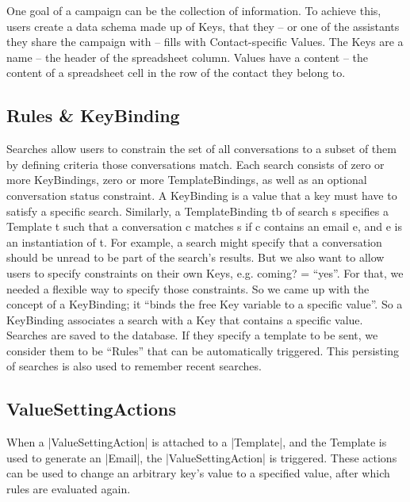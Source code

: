 One goal of a campaign can be the collection of information. To achieve this, users create a data schema made up of Keys, that they -- or one of the assistants they share the campaign with -- fills with Contact-specific Values. The Keys are a name – the header of the spreadsheet column. Values have a content – the content of a spreadsheet cell in the row of the contact they belong to.
\pagebreak
\subsection{Rules \& KeyBinding}


Searches allow users to constrain the set of all conversations to a subset of them by defining criteria those conversations match. Each search consists of zero or more KeyBindings, zero or more TemplateBindings, as well as an optional conversation status constraint. A KeyBinding is a value that a key must have to satisfy a specific search. Similarly, a TemplateBinding tb of search s specifies a Template t such that a conversation c matches s if c contains an email e, and e is an instantiation of t.
For example, a search might specify that a conversation should be unread to be part of the search’s results. But we also want to allow users to specify constraints on their own Keys, e.g. coming? = ``yes''. For that, we needed a flexible way to specify those constraints. So we came up with the concept of a KeyBinding; it ``binds the free Key variable to a specific value''. So a KeyBinding associates a search with a Key that contains a specific value.
Searches are saved to the database. If they specify a template to be sent, we consider them to be ``Rules'' that can be automatically triggered. This persisting of searches is also used to remember recent searches.

\pagebreak
\subsection{ValueSettingActions}

When a |ValueSettingAction| is attached to a |Template|, and the Template is used to generate an |Email|, the |ValueSettingAction| is triggered. These actions can be used to change an arbitrary key's value to a specified value, after which rules are evaluated again.


